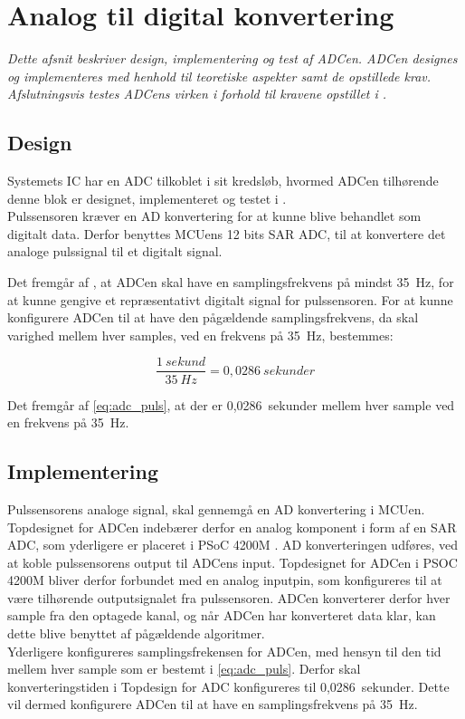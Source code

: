 \section{Analog til digital konvertering}
\textit{Dette afsnit beskriver design, implementering og test af ADCen. ADCen designes og implementeres med henhold til teoretiske aspekter samt de opstillede krav. Afslutningsvis testes ADCens virken i forhold til kravene opstillet i .}

\subsection{Design}
Systemets IC har en ADC tilkoblet i sit kredsløb, hvormed ADCen tilhørende denne blok er designet, implementeret og testet i .\\
Pulssensoren kræver en AD konvertering for at kunne blive behandlet som digitalt data. Derfor benyttes MCUens 12 bits SAR ADC, til at konvertere det analoge pulssignal til et digitalt signal. 

Det fremgår af , at ADCen skal have en samplingsfrekvens på mindst 35~Hz, for at kunne gengive et repræsentativt digitalt signal for pulssensoren. For at kunne konfigurere ADCen til at have den pågældende samplingsfrekvens, da skal varighed mellem hver samples, ved en frekvens på 35~Hz, bestemmes:

\begin{equation}
\frac{1~sekund}{35~Hz} = 0,0286~sekunder
\label{eq:adc_puls}
\end{equation}

Det fremgår af \eqref{eq:adc_puls}, at der er 0,0286~sekunder mellem hver sample ved en frekvens på 35~Hz. 

\subsection{Implementering}
Pulssensorens analoge signal, skal gennemgå en AD konvertering i MCUen. Topdesignet for ADCen indebærer derfor en analog komponent i form af en SAR ADC, som yderligere er placeret i PSoC 4200M \citep{Murphy2016}. 
AD konverteringen udføres, ved at koble pulssensorens output til ADCens input. Topdesignet for ADCen i PSOC 4200M bliver derfor forbundet med en analog inputpin, som konfigureres til at være tilhørende outputsignalet fra pulssensoren. ADCen konverterer derfor hver sample fra den optagede kanal, og når ADCen har konverteret data klar, kan dette blive benyttet af pågældende algoritmer. \\
Yderligere konfigureres samplingsfrekensen for ADCen, med hensyn til den tid mellem hver sample som er bestemt i \eqref{eq:adc_puls}.
Derfor skal konverteringstiden i Topdesign for ADC konfigureres til 0,0286~sekunder. Dette vil dermed konfigurere ADCen til at have en samplingsfrekvens på 35~Hz.


